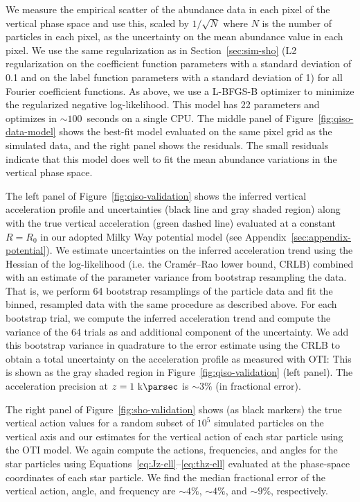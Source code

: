 We measure the empirical scatter of the abundance data in each pixel of the vertical
phase space and use this, scaled by $1/\sqrt{N}$ where $N$ is the number of particles in
each pixel, as the uncertainty on the mean abundance value in each pixel.
We use the same regularization as in Section~\ref{sec:sim-sho} (L2 regularization on the
coefficient function parameters with a standard deviation of 0.1 and on the label
function parameters with a standard deviation of 1) for all Fourier coefficient
functions.
As above, we use a L-BFGS-B optimizer to minimize the regularized negative
log-likelihood.
This model has 22 parameters and optimizes in $\sim 100$~seconds on a single CPU.
The middle panel of Figure~\ref{fig:qiso-data-model} shows the best-fit model evaluated
on the same pixel grid as the simulated data, and the right panel shows the residuals.
The small residuals indicate that this model does well to fit the mean abundance
variations in the vertical phase space.

The left panel of Figure~\ref{fig:qiso-validation} shows the inferred vertical
acceleration profile and uncertainties (black line and gray shaded region) along with
the true vertical acceleration (green dashed line) evaluated at a constant $R=R_0$ in
our adopted Milky Way potential model (see Appendix~\ref{sec:appendix-potential}).
We estimate uncertainties on the inferred acceleration trend using the Hessian of the
log-likelihood (i.e. the Cram\'{e}r--Rao lower bound, CRLB) combined with an estimate of
the parameter variance from bootstrap resampling the data.
That is, we perform 64 bootstrap resamplings of the particle data and fit the binned,
resampled data with the same procedure as described above.
For each bootstrap trial, we compute the inferred acceleration trend and compute the
variance of the 64 trials as and additional component of the uncertainty.
We add this bootstrap variance in quadrature to the error estimate using the CRLB to
obtain a total uncertainty on the acceleration profile as measured with OTI: This is
shown as the gray shaded region in Figure~\ref{fig:qiso-validation} (left panel).
The acceleration precision at $z=1~\kpc$ is $\sim 3\%$ (in fractional error).

The right panel of Figure~\ref{fig:sho-validation} shows (as black markers) the true
vertical action values for a random subset of $10^5$ simulated particles on the vertical
axis and our estimates for the vertical action of each star particle using the OTI
model.
We again compute the actions, frequencies, and angles for the star particles using
Equations~\ref{eq:Jz-ell}--\ref{eq:thz-ell} evaluated at the phase-space coordinates of
each star particle.
We find the median fractional error of the vertical action, angle, and frequency are
$\sim 4\%$, $\sim 4\%$, and $\sim 9\%$, respectively.



